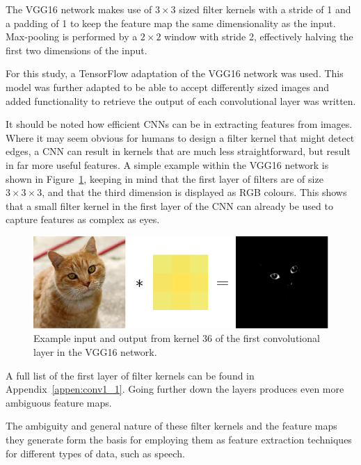 The VGG16 network makes use of $3\times3$ sized filter kernels with a stride of 1 and a padding of 1 to keep the feature map the same dimensionality as the input.
Max-pooling is performed by a $2\times2$ window with stride 2, effectively halving the first two dimensions of the input.\cite{DBLP:journals/corr/SimonyanZ14a}

For this study, a TensorFlow adaptation of the VGG16 network was used\cite{frossard_2016}.
This model was further adapted to be able to accept differently sized images and added functionality to retrieve the output of each convolutional layer was written.

It should be noted how efficient CNNs can be in extracting features from images.
Where it may seem obvious for humans to design a filter kernel that might detect edges, a CNN can result in kernels that are much less straightforward, but result in far more useful features.
A simple example within the VGG16 network is shown in Figure~\ref{fig:filter_36}, keeping in mind that the first layer of filters are of size $3\times3\times3$, and that the third dimension is displayed as RGB colours.
This shows that a small filter kernel in the first layer of the CNN can already be used to capture features as complex as eyes.

\begin{figure}
    \centering
    \includegraphics[width=0.6\linewidth]{content/fig/kernel36.png}
    \caption{Example input and output from  kernel 36 of the first convolutional layer in the VGG16 network.}
    \label{fig:filter_36}
\end{figure}

A full list of the first layer of filter kernels can be found in Appendix~\ref{appen:conv1_1}.
Going further down the layers produces even more ambiguous feature maps. 


The ambiguity and general nature of these filter kernels and the feature maps they generate form the basis for employing them as feature extraction techniques for different types of data, such as speech.